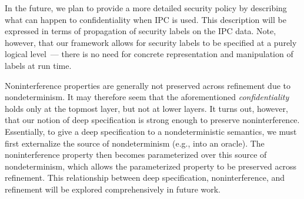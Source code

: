 {In the future, we plan to provide a more detailed security policy by
describing what can happen to confidentiality when IPC is used.  This
description will be expressed in terms of propagation of security
labels on the IPC data. Note, however, that our framework allows for
security labels to be specified at a purely logical level~--- there is
no need for concrete representation and manipulation of labels at run
time.

Noninterference properties are generally not preserved across
refinement due to nondeterminism. It may therefore seem that the
aforementioned \emph{confidentiality} holds only at the topmost layer,
but not at lower layers. It turns out, however, that our notion of
deep specification is strong enough to preserve
noninterference. Essentially, to give a deep specification to a
nondeterministic semantics, we must first externalize the source of
nondeterminism (e.g., into an oracle). The noninterference property
then becomes parameterized over this source of nondeterminism, which
allows the parameterized property to be preserved across
refinement. This relationship between deep specification,
noninterference, and refinement will be explored comprehensively in
future work.
}

